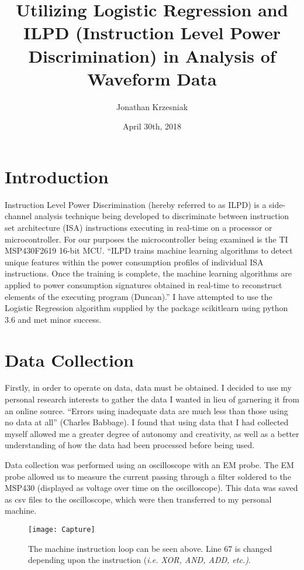 \documentclass{article}
\title{Utilizing Logistic Regression and ILPD (Instruction Level Power Discrimination) in Analysis of Waveform Data}
\author{Jonathan Krzesniak}
\date{April 30th, 2018}
\newcommand\tab[1][1cm]{\hspace*{#1}}
\begin{document}
\maketitle

\section{Introduction}

\tab    
Instruction Level Power Discrimination (hereby referred to as ILPD) is a side-channel analysis technique being developed to discriminate between instruction set architecture (ISA) instructions executing in real-time on a processor or microcontroller. For our purposes the microcontroller being examined is the TI MSP430F2619 16-bit MCU. “ILPD trains machine learning algorithms to detect unique features within the power consumption profiles of individual ISA instructions. Once the training is complete, the machine learning algorithms are applied to power consumption signatures obtained in real-time to reconstruct elements of the executing program (Duncan).” I have attempted to use the Logistic Regression algorithm supplied by the package scikitlearn using python 3.6 and met minor success. 

\section{Data Collection} 
\tab 
	Firstly, in order to operate on data, data must be obtained. I decided to use my personal research interests to gather the data I wanted in lieu of garnering it from an online source. “Errors using inadequate data are much less than those using no data at all” (Charles Babbage). I found that using data that I had collected myself allowed me a greater degree of autonomy and creativity, as well as a better understanding of how the data had been processed before being used.
	

	Data collection was performed using an oscilloscope with an EM probe. The EM probe allowed us to measure the current passing through a filter soldered to the MSP430 (displayed as voltage over time on the oscilloscope). This data was saved as csv files to the oscilloscope, which were then transferred to my personal machine.
	
\begin{figure}
    \centering
    \texttt{[image: Capture]}
    \caption{The machine instruction loop can be seen above. Line 67 is changed depending upon the instruction (\textit{i.e. XOR, AND, ADD, etc.)}.}
    \label{fig:my_label}
\end{figure}
	
\end{document}
